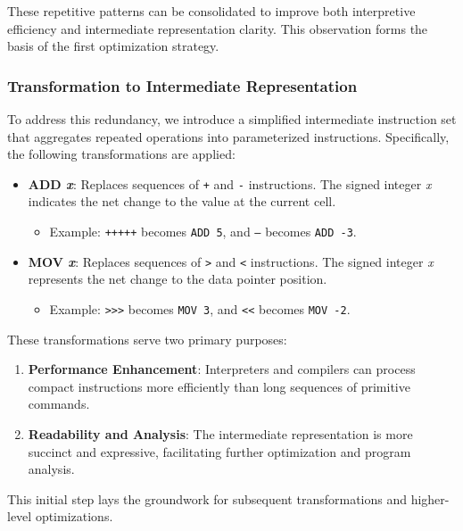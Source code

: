 These repetitive patterns can be consolidated to improve both interpretive efficiency and intermediate representation clarity. This observation forms the basis of the first optimization strategy.

\subsubsection*{Transformation to Intermediate Representation}

To address this redundancy, we introduce a simplified intermediate instruction set that aggregates repeated operations into parameterized instructions. Specifically, the following transformations are applied:

\begin{itemize}
    \item \textbf{ADD \textit{x}}: Replaces sequences of \texttt{+} and \texttt{-} instructions. The signed integer \textit{x} indicates the net change to the value at the current cell.
    \begin{itemize}
        \item Example: \texttt{+++++} becomes \texttt{ADD 5}, and \texttt{---} becomes \texttt{ADD -3}.
    \end{itemize}

    \item \textbf{MOV \textit{x}}: Replaces sequences of \texttt{>} and \texttt{<} instructions. The signed integer \textit{x} represents the net change to the data pointer position.
    \begin{itemize}
        \item Example: \texttt{>>>} becomes \texttt{MOV 3}, and \texttt{<<} becomes \texttt{MOV -2}.
    \end{itemize}
\end{itemize}

These transformations serve two primary purposes:

\begin{enumerate}
    \item \textbf{Performance Enhancement}: Interpreters and compilers can process compact instructions more efficiently than long sequences of primitive commands.
    \item \textbf{Readability and Analysis}: The intermediate representation is more succinct and expressive, facilitating further optimization and program analysis.
\end{enumerate}

This initial step lays the groundwork for subsequent transformations and higher-level optimizations.

